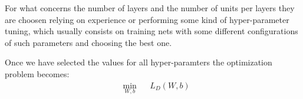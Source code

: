 For what concerns the number of layers and the number of units per layers they are choosen relying on experience or performing some kind of hyper-parameter tuning, which usually consists on training nets
with some different configurations of such parameters and choosing the best one.

Once we have selected the values for all hyper-paramters the optimization problem becomes:
\begin{equation}
\begin{aligned}
& \underset{W,b}{\text{min}}
& & L_D(W,b) \\
\end{aligned}
\end{equation}




